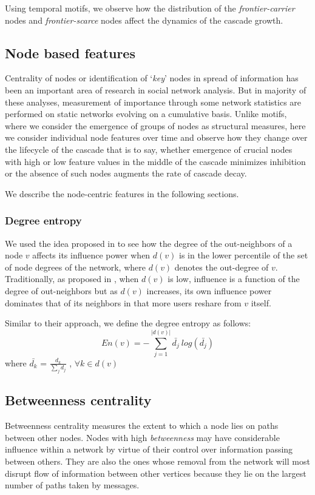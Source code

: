 \documentclass[smallextended]{svjour3}       %
\theoremstyle{definition}
\begin{document}
\indent Using temporal motifs, we observe how the distribution of the \textit{frontier-carrier} nodes and \textit{frontier-scarce} nodes affect the dynamics of the cascade growth.

\subsection{Node based features}\label{sec:node_feat}
Centrality of nodes or identification of `\textit{key}' nodes in spread of information has been an important area of research in social network analysis. But in majority of these analyses, measurement of importance through some network statistics are performed on static networks evolving on a cumulative basis. 
Unlike motifs, where we consider the emergence of groups of nodes as structural measures, here we consider individual node features over time and observe how they change over the lifecycle of the cascade that is to say, whether emergence of crucial nodes with high or low feature values in the middle of the cascade minimizes inhibition or the absence of such nodes augments the rate of cascade decay.

We describe the node-centric features in the following sections.

\subsubsection{Degree entropy}
We used the idea proposed in \cite{deg_entropy} to see how the degree of the out-neighbors of a node $v$ affects its influence power when $d(v)$ is in the lower percentile of the set of node degrees of the network, where $d(v)$ denotes the out-degree of $v$.
Traditionally, as proposed in \cite{deg_entropy}, when $d(v)$ is low, influence is a function of the degree of out-neighbors but as $d(v)$ increases, its own influence power dominates that of its neighbors in that more users reshare from $v$ itself.

Similar to their approach, we define the degree entropy as follows:
\begin{equation}
En(v) = -\sum_{j=1}^{|d(v)|} \bar{d_j} \ log(\bar{d_j})
\end{equation}
where $ \bar{d_k}$ = $\frac{d_k}{\sum_j d_j}$ , $\forall k \in d(v)$

\subsection{Betweenness centrality}
Betweenness centrality measures the extent to which a node lies on paths between other nodes. Nodes with high \textit{betweenness} may have considerable influence within a network by virtue of their control over information passing between others. They are also the ones whose removal from the network will most disrupt flow of information between other vertices because they lie on the largest number of paths taken by messages.
\end{document}
